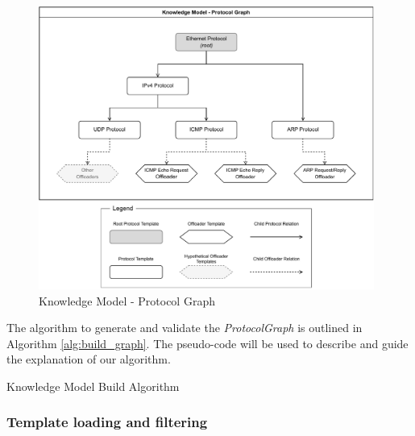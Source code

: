 \begin{figure}[htb]
    \caption{Knowledge Model - Protocol Graph}
    \begin{center}
        \includegraphics[width=0.98\textwidth]{images/icmp_ex_protocol_graph.pdf}  
    \end{center}
    \label{fig:protocol_graph}
\end{figure}

The algorithm to generate and validate the \textit{ProtocolGraph} is outlined in Algorithm \ref{alg:build_graph}. The pseudo-code will be used to describe and guide the explanation of our algorithm.

\begin{algorithm}%
    \caption{Knowledge Model Build Algorithm}
    \begin{algorithmic}[1]
        
    \end{algorithmic}
    \label{alg:build_graph}
\end{algorithm}


%     


\subsubsection*{Template loading and filtering}

